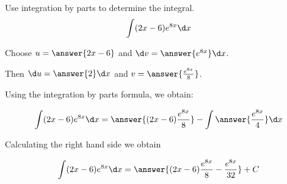 \documentclass{ximera}
\author{Jason Miller}
\begin{document}
\begin{exercise}
Use integration by parts to determine the integral.
\[
\int (2x-6) e^{8x} \d x 
\]


Choose $u=\answer{ 2x-6}$ and $\d v=\answer{e^{8x} } \d x$. 

Then $\d u= \answer{ 2 } \d x$ and $v= \answer{ \frac{e^{8x}}{8} }$.

Using the integration by parts formula, we obtain:

\[
\int (2x-6)e^{8x} \d x= \answer{(2x-6)\frac{e^{8x}}{8}} - \int \answer{ \frac{e^{8x}}{4} } \d x
\]

Calculating the right hand side we obtain

\[
\int (2x-6)e^{8x} \d x= \answer{ (2x-6)\frac{e^{8x}}{8} - \frac{e^{8x}}{32}   } + C
\]


\end{exercise}
\end{document}
